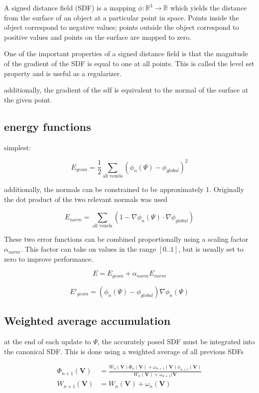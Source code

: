 \documentclass[12pt,twoside]{report}
\begin{document}
A signed distance field (SDF) is a mapping $\phi : \mathbb{R}^3 \rightarrow  \mathbb{R}$ which yields the distance from the surface of an object at a particular point in space. 
Points inside the object correspond to negative values; points outside the object correspond to positive values and points on the surface are mapped to zero.

One of the important properties of a signed distance field is that the magnitude of the gradient of the SDF is equal to one at all points. This is called the level set property and is useful as a regularizer.

additionally, the gradient of the sdf is equivalent to the normal of the surface at the given point.






\subsection{energy functions}

simplest:

$$ E_{geom} = \frac{1}{2} \sum\limits_{\textrm{all voxels}} (\phi_n(\Psi) - \phi_{global})^2  $$


additionally, the normals can be constrained to be approximately 1. Originally the dot product of the two relevant normals was used

$$ E_{norm} = \sum\limits_{\textrm{all voxels}}(1 - \nabla \phi_n(\Psi) \cdot \nabla\phi_{global}) $$

These two error functions can be combined proportionally using a scaling factor $\alpha_{norm}$. This factor can take on values in the range $[0..1]$, but is usually set to zero to improve performance.

$$E = E_{geom} + \alpha_{norm}E_{norm}$$

$$ E'_{geom} = (\phi_n(\Psi) - \phi_{global}) \nabla \phi_n(\Psi)$$

\subsection{Weighted average accumulation}

at the end of each update to $\Psi$, the accurately posed SDF must be integrated into the canonical SDF. This is done using a weighted average of all previous SDFs

\begin{align*}
\Phi_{n+1}(\textbf{V}) &= \frac{W_n(\textbf{V})\Phi_n(\textbf{V}) + \omega_{n+1}(\textbf{V})\phi_{n+1}(\textbf{V})}{W_{n}(\textbf{V}) + \omega_{n+1}(\textbf{V}}\\
W_{n+1}(\textbf{V}) &= W_n(\textbf{V}) + \omega_n(\textbf{V}) \\
\end{align*}
\end{document}
